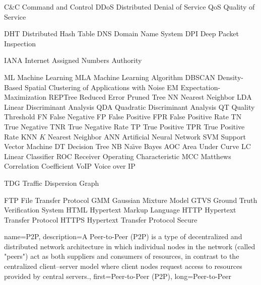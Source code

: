  {C\&C} {Command and Control}
 {DDoS} {Distributed Denial of Service}
 {QoS} {Quality of Service}

 {DHT} {Distributed Hash Table}
 {DNS} {Domain Name System}
 {DPI} {Deep Packet Inspection}

 {IANA} {Internet Assigned Numbers Authority}

 {ML} {Machine Learning}
 {MLA} {Machine Learning Algorithm}
 {DBSCAN} {Density-Based Spatial Clustering of Applications with Noise}
 {EM} {Expectation-Maximization}
 {REPTree} {Reduced Error Pruned Tree}
 {NN} {Nearest Neighbor}
 {LDA} {Linear Discriminant Analysis}
 {QDA} {Quadratic Discriminant Analysis}
 {QT} {Quality Threshold}
 {FN} {False Negative}
 {FP} {False Positive}
 {FPR} {False Positive Rate}
 {TN} {True Negative}
 {TNR} {True Negative Rate}
 {TP} {True Positive}
 {TPR} {True Positive Rate}
 {KNN} {$K$ Nearest Neighbor}
 {ANN} {Artificial Neural Network}
 {SVM} {Support Vector Machine}
 {DT} {Decision Tree}
 {NB} {Na\"{\i}ve Bayes}
 {AOC} {Area Under Curve}
 {LC} {Linear Classifier}
 {ROC} {Receiver Operating Characteristic}
 {MCC} {Matthews Correlation Coefficient}
 {VoIP} {Voice over IP}

 {TDG} {Traffic Dispersion Graph}

 {FTP} {File Transfer Protocol}
 {GMM} {Gaussian Mixture Model}
 {GTVS} {Ground Truth Verification System}
 {HTML} {Hypertext Markup Language}
 {HTTP} {Hypertext Transfer Protocol}
 {HTTPS} {Hypertext Transfer Protocol Secure}

{
    name={P2P},
    description={A Peer-to-Peer (P2P) is a type of decentralized and distributed network architecture in which individual nodes in the network (called "peers") act as both suppliers and consumers of resources, in contrast to the centralized client–server model where client nodes request access to resources provided by central servers.},
    first={Peer-to-Peer (P2P)},
    long={Peer-to-Peer}
}

